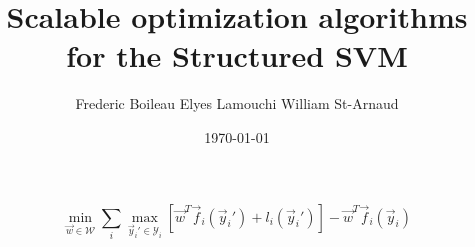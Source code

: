 

\usepackage[
  backend=biber,
  style=numeric,
  citestyle=numeric
]{biblatex}

\title{Scalable optimization algorithms for the Structured SVM}
\date{\today}
\author{Frederic Boileau Elyes Lamouchi William St-Arnaud}


\begin{equation}
  \min_{\vec w \in \mathcal{W}} \sum_i \max_{\vec y_i' \in \mathcal{Y}_i} \left[
\vec w^T \vec f_i(\vec y_i') + l_i(\vec y_i') \right] - \vec w^T \vec f_i(\vec
y_i)
\end{equation}



